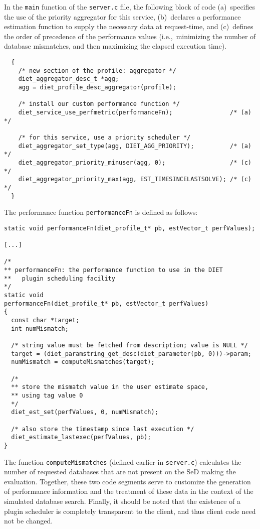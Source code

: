 In the \texttt{main} function of the \texttt{server.c} file, the
following block of code (a)~specifies the use of the priority
aggregator for this service, (b)~declares a performance estimation
function to supply the necessary data at request-time, and
(c)~defines the order of precedence of the performance values
(i.e.,~minimizing the number of database mismatches, and then
maximizing the elapsed execution time).
\begin{verbatim}
  {
    /* new section of the profile: aggregator */
    diet_aggregator_desc_t *agg;
    agg = diet_profile_desc_aggregator(profile);

    /* install our custom performance function */
    diet_service_use_perfmetric(performanceFn);                /* (a) */

    /* for this service, use a priority scheduler */
    diet_aggregator_set_type(agg, DIET_AGG_PRIORITY);          /* (a) */
    diet_aggregator_priority_minuser(agg, 0);                  /* (c) */
    diet_aggregator_priority_max(agg, EST_TIMESINCELASTSOLVE); /* (c) */
  }
\end{verbatim}
The performance function \texttt{performanceFn} is defined as follows:
\begin{verbatim}
static void performanceFn(diet_profile_t* pb, estVector_t perfValues);

[...]

/*
** performanceFn: the performance function to use in the DIET
**   plugin scheduling facility
*/
static void
performanceFn(diet_profile_t* pb, estVector_t perfValues)
{
  const char *target;
  int numMismatch;

  /* string value must be fetched from description; value is NULL */
  target = (diet_paramstring_get_desc(diet_parameter(pb, 0)))->param;
  numMismatch = computeMismatches(target);

  /*
  ** store the mismatch value in the user estimate space,
  ** using tag value 0
  */
  diet_est_set(perfValues, 0, numMismatch);

  /* also store the timestamp since last execution */
  diet_estimate_lastexec(perfValues, pb);
}
\end{verbatim}
The function \texttt{computeMismatches} (defined earlier in
\texttt{server.c}) calculates the number of requested databases that
are not present on the SeD making the evaluation.
Together, these two code segments serve to customize the generation of
performance information and the treatment of these data in the context
of the simulated database search.
Finally, it should be noted that the existence of a plugin scheduler
is completely transparent to the client, and thus client code need not
be changed.

